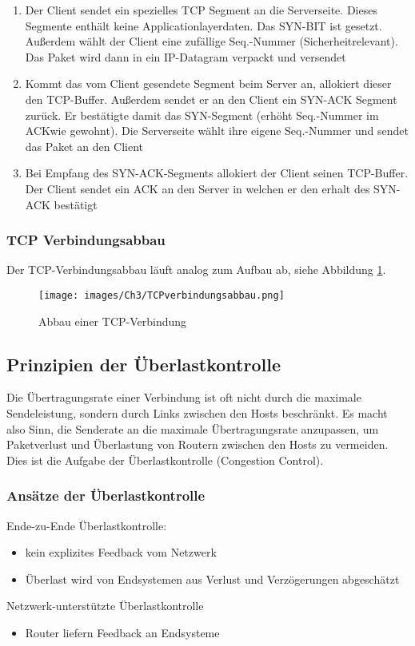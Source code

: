 \begin{enumerate}
    \item Der Client sendet ein spezielles TCP Segment an die Serverseite. Dieses Segmente enthält keine Applicationlayerdaten. Das SYN-BIT ist gesetzt. Außerdem wählt der Client eine zufällige Seq.-Nummer (Sicherheitrelevant). Das Paket wird dann in ein IP-Datagram verpackt und versendet
    \item Kommt das vom Client gesendete Segment beim Server an, allokiert dieser den TCP-Buffer. Außerdem sendet er an den Client ein SYN-ACK Segment zurück. Er bestätigte damit das SYN-Segment (erhöht Seq.-Nummer im ACKwie gewohnt). Die Serverseite wählt ihre eigene Seq.-Nummer und sendet das Paket an den Client
    \item Bei Empfang des SYN-ACK-Segments allokiert der Client seinen TCP-Buffer. Der Client sendet ein ACK an den Server in welchen er den erhalt des SYN-ACK bestätigt
\end{enumerate}

\subsubsection{TCP Verbindungsabbau}
Der TCP-Verbindungsabbau läuft analog zum Aufbau ab, siehe Abbildung \ref{Ch03-TCP-Verbindungsabbau}.

\begin{figure}[H]
    \centering
    \texttt{[image: images/Ch3/TCPverbindungsabbau.png]}
    \caption{Abbau einer TCP-Verbindung}
    \label{Ch03-TCP-Verbindungsabbau}
\end{figure}

\subsection{Prinzipien der Überlastkontrolle}
Die Übertragungsrate einer Verbindung ist oft nicht durch die maximale Sendeleistung, sondern durch Links zwischen den Hosts beschränkt.
Es macht also Sinn, die Senderate an die maximale Übertragungsrate anzupassen, um Paketverlust und Überlastung von Routern zwischen den Hosts zu vermeiden.
Dies ist die Aufgabe der Überlastkontrolle (Congestion Control).

\subsubsection{Ansätze der Überlastkontrolle}
\noindent Ende-zu-Ende Überlastkontrolle:
\begin{itemize}
    \item kein explizites Feedback vom Netzwerk
    \item Überlast wird von Endsystemen aus Verlust und Verzögerungen abgeschätzt
\end{itemize}
\noindent Netzwerk-unterstützte Überlastkontrolle
\begin{itemize}
    \item Router liefern Feedback an Endsysteme
\end{itemize}

